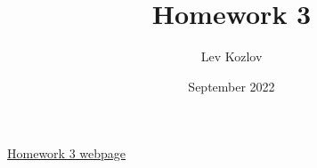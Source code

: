 \documentclass{article}
\title{Homework 3}
\author{Lev Kozlov}
\date{September 2022}
\begin{document}
\maketitle

\href{https://lvjonok.github.io/f22-theoretical-mechanics/2022/09/18/homework3.html}{Homework 3 webpage}



\newpage


\end{document}
